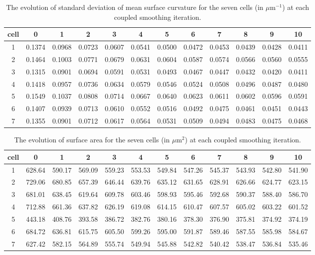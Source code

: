 \documentclass[a4paper,10pt]{article}
\begin{document}
\begin{table}[H]
\begin{center}
\footnotesize
\begin{tabular}{|c|ccccccccccc|}
\hline
cell & 0 &1 &2 &3 &4 &5 &6 &7 &8 &9 &10\\
\hline
1 &0.1374 &0.0968 &0.0723 &0.0607 &0.0541 &0.0500 &0.0472 &0.0453 &0.0439 &0.0428 &0.0411\\
2 &0.1464 &0.1003 &0.0771 &0.0679 &0.0631 &0.0604 &0.0587 &0.0574 &0.0566 &0.0560 &0.0555\\
3 &0.1315 &0.0901 &0.0694 &0.0591 &0.0531 &0.0493 &0.0467 &0.0447 &0.0432 &0.0420 &0.0411\\
4 &0.1418 &0.0957 &0.0736 &0.0634 &0.0579 &0.0546 &0.0524 &0.0508 &0.0496 &0.0487 &0.0480\\
5 &0.1549 &0.1037 &0.0808 &0.0714 &0.0667 &0.0640 &0.0623 &0.0611 &0.0602 &0.0596 &0.0591\\
6 &0.1407 &0.0939 &0.0713 &0.0610 &0.0552 &0.0516 &0.0492 &0.0475 &0.0461 &0.0451 &0.0443\\
7 &0.1355 &0.0901 &0.0712 &0.0617 &0.0564 &0.0531 &0.0509 &0.0494 &0.0483 &0.0475 &0.0468\\
\hline
\end{tabular}
\end{center}
\caption{The evolution of standard deviation of mean surface curvature for the seven cells (in $\mu \text{m}^{-1}$)  at each coupled smoothing iteration.}
\label{tab:curv}
\end{table}

\begin{table}[H]
\begin{center}
\footnotesize
\begin{tabular}{|c|ccccccccccc|}
\hline
cell & 0 &1 &2 &3 &4 &5 &6 &7 &8 &9 &10\\
\hline
1 &628.64 &590.17 &569.09 &559.23 &553.53 &549.84 &547.26 &545.37 &543.93 &542.80 &541.90\\
2 &729.06 &680.85 &657.39 &646.44 &639.76 &635.12 &631.65 &628.91 &626.66 &624.77 &623.15\\
3 &681.01 &638.45 &619.64 &609.78 &603.46 &598.93 &595.46 &592.68 &590.37 &588.40 &586.70\\
4 &712.88 &661.36 &637.82 &626.19 &619.08 &614.15 &610.47 &607.57 &605.02 &603.22 &601.52\\
5 &443.18 &408.76 &393.58 &386.72 &382.76 &380.16 &378.30 &376.90 &375.81 &374.92 &374.19\\
6 &684.72 &636.81 &615.75 &605.50 &599.26 &595.00 &591.87 &589.46 &587.55 &585.98 &584.67\\
7 &627.42 &582.15 &564.89 &555.74 &549.94 &545.88 &542.82 &540.42 &538.47 &536.84 &535.46\\
\hline
\end{tabular}
\end{center}
\caption{The evolution of surface area for the seven cells (in $\mu \text{m}^2$)  at each coupled smoothing iteration.}
\label{tab:surf}
\end{table}
\end{document}

